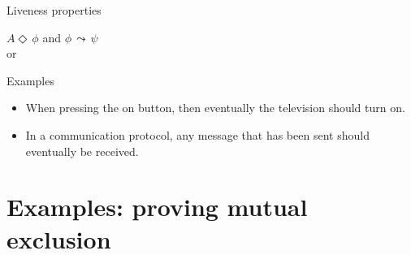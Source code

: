 \documentclass[aspectratio=169]{beamer}
\begin{document}
\begin{slide}{Liveness properties}
\small

\begin{block}{$A \Diamond\, \phi$ and $\phi\, \leadsto \, \psi$}
\vspace{5mm}
\\
 or 
\vspace{5mm}

Examples\\
\begin{itemize}
\item \alert{When pressing the on button, then eventually the television should turn on}.
\item \alert{In a communication protocol, any message that has been sent should eventually be received}.
\end{itemize}

\end{block}

\end{slide}






\section{Examples: proving mutual exclusion}
\end{document}
